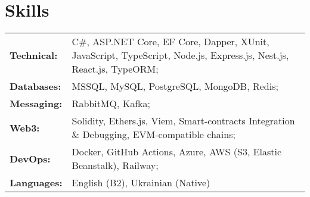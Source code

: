 \section{Skills}\label{sec:skills}

\begin{tabular}{p{} p{}}
    \textbf{Technical:}
    & C\#, ASP.NET Core, EF Core, Dapper, XUnit,\newline
    JavaScript, TypeScript, Node.js, Express.js, Nest.js, React.js, TypeORM; \\
    \textbf{Databases:}
    & MSSQL, MySQL, PostgreSQL, MongoDB, Redis; \\
    \textbf{Messaging:}
    & RabbitMQ, Kafka; \\
    \textbf{Web3:}
    & Solidity, Ethers.js, Viem, Smart-contracts Integration \& Debugging, EVM-compatible chains; \\
    \textbf{DevOps:}
    & Docker, GitHub Actions, Azure, AWS (S3, Elastic Beanstalk), Railway; \\
    \textbf{Languages:}
    & English (B2), Ukrainian (Native)
\end{tabular}
